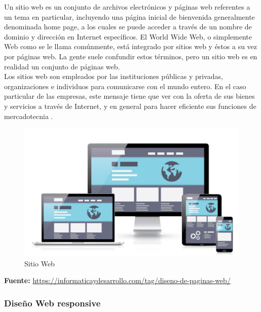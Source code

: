		{Un sitio web es un conjunto de archivos electrónicos y páginas web referentes a un tema en particular, incluyendo una página inicial de bienvenida generalmente denominada home page, a los cuales se puede acceder a través de un nombre de dominio y dirección en Internet específicos. El World Wide Web, o simplemente Web como se le llama comúnmente, está integrado por sitios web y éstos a su vez por páginas web. La gente suele confundir estos términos, pero un sitio web es en realidad un conjunto de páginas web.\\
			
		Los sitios web son empleados por las instituciones públicas y privadas, organizaciones e individuos para comunicarse con el mundo entero. En el caso particular de las empresas, este mensaje tiene que ver con la oferta de sus bienes y servicios a través de Internet, y en general para hacer eficiente sus funciones de mercadotecnia \cite{website}.
	
		\begin{figure}[H]
			\centering
			\includegraphics[width=0.8\linewidth]{description/framework/website.png}
			\caption{Sitio Web}
		\end{figure}
		\begin{center}
			\textbf{Fuente:} \url{https://informaticaydesarrollo.com/tag/diseno-de-paginas-web/}
		\end{center}
		}
		
		
		\subsubsection{Diseño Web responsive}
		
